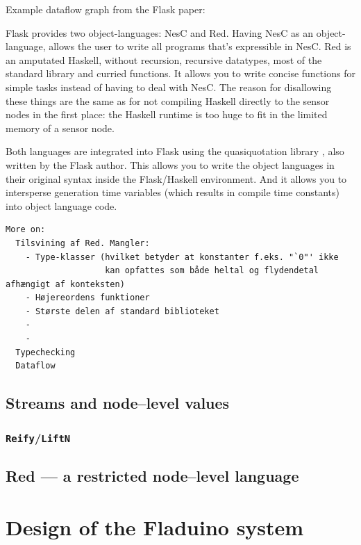 \documentclass[a4paper, oneside, final]{memoir}
\begin{document}
Example dataflow graph from the Flask paper: 

\begin{figure}
\end{figure}

Flask provides two object-languages: NesC and Red. Having NesC as an
object-language, allows the user to write all programs that's
expressible in NesC. Red is an amputated Haskell, without recursion,
recursive datatypes, most of the standard library and curried
functions. It allows you to write concise functions for simple tasks
instead of having to deal with NesC. The reason for disallowing these
things are the same as for not compiling Haskell directly to the
sensor nodes in the first place: the Haskell runtime is too huge to
fit in the limited memory of a sensor node.

Both languages are integrated into Flask using the quasiquotation
library \cite{quasiquote07}, also written by the Flask author. This
allows you to write the object languages in their original syntax
inside the Flask/Haskell environment. And it allows you to intersperse
generation time variables (which results in compile time constants)
into object language code.


\begin{verbatim}
More on:
  Tilsvining af Red. Mangler:
    - Type-klasser (hvilket betyder at konstanter f.eks. "`0"' ikke
                    kan opfattes som både heltal og flydendetal afhængigt af konteksten)
    - Højereordens funktioner
    - Største delen af standard biblioteket
    - 
    - 
  Typechecking
  Dataflow
\end{verbatim}

\section{Streams and node--level values}

\subsection{\texttt{Reify}/\texttt{LiftN}}

\section{Red --- a restricted node--level language}

\chapter{Design of the Fladuino system}
\end{document}
